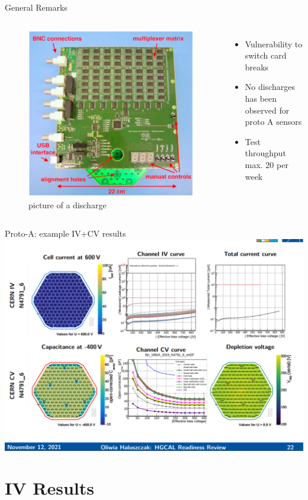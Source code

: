 \documentclass{beamer}
\begin{document}
\begin{frame}{General Remarks}
  \begin{columns}
      \begin{figure}
        \includegraphics[width=.3\textwidth]{plots/Switch_Card.png}
        \caption{picture of a discharge}
      \end{figure}

    \begin{itemize}
      \item Vulnerability to switch card breaks
      \item No discharges has been observed for proto A sensors
      \item Test throughput max. 20 per week
    \end{itemize}
  \end{columns}
\end{frame}


\begin{frame}{Proto-A: example IV+CV results}
  \includegraphics[width=.8\textwidth]{plots/IV_CV_example.png}
\end{frame}
  

\section{IV Results}
\end{document}
